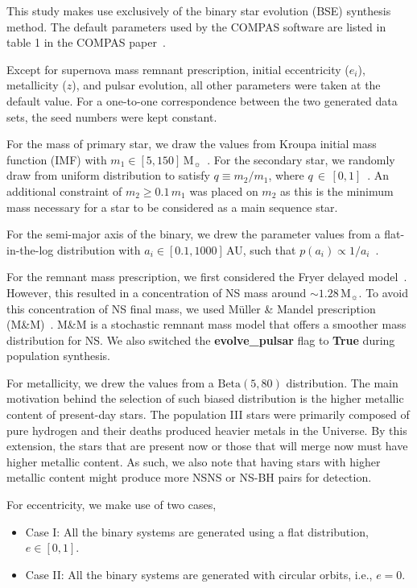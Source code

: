 \documentclass[12pt, journal, onecolumn]{IEEEtran}
\begin{document}
    This study makes use exclusively of the binary star evolution (BSE) synthesis method.
    The default parameters used by the COMPAS software are listed in table 1 in the COMPAS paper~\cite{Riley2022}.

    Except for supernova mass remnant prescription, initial eccentricity ($e_i$), metallicity ($z$), and pulsar evolution, all other parameters were taken at the default value.
    For a one-to-one correspondence between the two generated data sets, the seed numbers were kept constant.

    For the mass of primary star, we draw the values from Kroupa initial mass function (IMF) with $m_1 \in [5, 150]\,\text{M}_\sun$~\cite{kroupa2001variation}.
    For the secondary star, we randomly draw from uniform distribution to satisfy $q\equiv m_2/m_1$, where $q\,\in\,[0, 1]$~\cite{sana2012binary}.
    An additional constraint of $m_2 \geq 0.1\,m_1$ was placed on $m_2$ as this is the minimum mass necessary for a star to be considered as a main sequence star.

    For the semi-major axis of the binary, we drew the parameter values from a flat-in-the-log distribution with $a_i \in [0.1, 1000]\,$AU, such that $p(a_i) \propto 1/a_i$~\cite{opik1924photographic}.

    For the remnant mass prescription, we first considered the Fryer delayed model~\cite{Fryer2012}.
    However, this resulted in a concentration of NS mass around $\sim1.28\,\text{M}_\sun$.
    To avoid this concentration of NS final mass, we used Müller \& Mandel prescription (M\&M)~\cite{Mandel2020}.
    M\&M is a stochastic remnant mass model that offers a smoother mass distribution for NS\@.
    We also switched the \textbf{evolve\_pulsar} flag to \textbf{True} during population synthesis.

    For metallicity, we drew the values from a $\text{Beta}(5, 80)$ distribution.
    The main motivation behind the selection of such biased distribution is the higher metallic content of present-day stars.
    The population III stars were primarily composed of pure hydrogen and their deaths produced heavier metals in the Universe.
    By this extension, the stars that are present now or those that will merge now must have higher metallic content.
    As such, we also note that having stars with higher metallic content might produce more NSNS or NS-BH pairs for detection.

    For eccentricity, we make use of two cases,
    \begin{itemize}
        \item Case I: All the binary systems are generated using a flat distribution, $e \in [0, 1]$.
        \item Case II: All the binary systems are generated with circular orbits, i.e., $e = 0$.
    \end{itemize}
\end{document}
